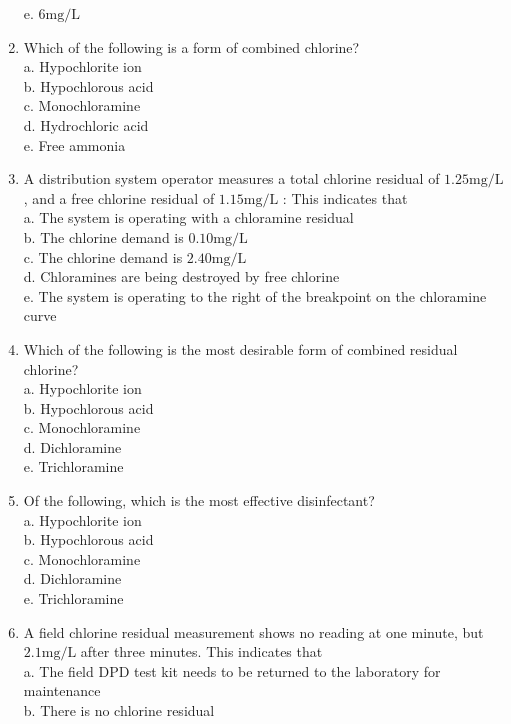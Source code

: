\begin{enumerate}[1.]
e. $6 \mathrm{mg} / \mathrm{L}$\\
\item Which of the following is a form of combined chlorine?\\
a. Hypochlorite ion\\
b. Hypochlorous acid\\
c. Monochloramine\\
d. Hydrochloric acid\\
e. Free ammonia\\
\item A distribution system operator measures a total chlorine residual of $1.25 \mathrm{mg} / \mathrm{L}$, and a free chlorine residual of $1.15 \mathrm{mg} / \mathrm{L}$ : This indicates that\\
a. The system is operating with a chloramine residual\\
b. The chlorine demand is $0.10 \mathrm{mg} / \mathrm{L}$\\
c. The chlorine demand is $2.40 \mathrm{mg} / \mathrm{L}$\\
d. Chloramines are being destroyed by free chlorine\\
e. The system is operating to the right of the breakpoint on the chloramine curve\\
\item Which of the following is the most desirable form of combined residual chlorine?\\
a. Hypochlorite ion\\
b. Hypochlorous acid\\
c. Monochloramine\\
d. Dichloramine\\
e. Trichloramine\\
\item Of the following, which is the most effective disinfectant?\\
a. Hypochlorite ion\\
b. Hypochlorous acid\\
c. Monochloramine\\
d. Dichloramine\\
e. Trichloramine\\
\item A field chlorine residual measurement shows no reading at one minute, but $2.1 \mathrm{mg} / \mathrm{L}$ after three minutes. This indicates that\\
a. The field DPD test kit needs to be returned to the laboratory for maintenance\\
b. There is no chlorine residual\\

\end{enumerate}
